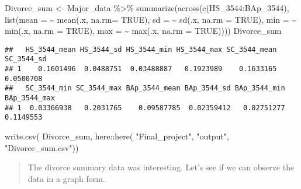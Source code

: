 \documentclass[
]{article}
\newenvironment{Shaded}{\begin{snugshade}}{\end{snugshade}}
\newcommand{\AttributeTok}[1]{\textcolor[rgb]{0.77,0.63,0.00}{#1}}
\newcommand{\ConstantTok}[1]{\textcolor[rgb]{0.00,0.00,0.00}{#1}}
\newcommand{\FunctionTok}[1]{\textcolor[rgb]{0.00,0.00,0.00}{#1}}
\newcommand{\NormalTok}[1]{#1}
\newcommand{\OtherTok}[1]{\textcolor[rgb]{0.56,0.35,0.01}{#1}}
\newcommand{\SpecialCharTok}[1]{\textcolor[rgb]{0.00,0.00,0.00}{#1}}
\newcommand{\StringTok}[1]{\textcolor[rgb]{0.31,0.60,0.02}{#1}}
\begin{document}
\begin{Shaded}
\begin{Highlighting}[]
\NormalTok{Divorce\_sum }\OtherTok{\textless{}{-}}\NormalTok{ Major\_data }\SpecialCharTok{\%\textgreater{}\%} 
  \FunctionTok{summarize}\NormalTok{(}\FunctionTok{across}\NormalTok{(}\FunctionTok{c}\NormalTok{(HS\_3544}\SpecialCharTok{:}\NormalTok{BAp\_3544),}
                      \FunctionTok{list}\NormalTok{(}\AttributeTok{mean =} \SpecialCharTok{\textasciitilde{}} \FunctionTok{mean}\NormalTok{(.x, }\AttributeTok{na.rm=} \ConstantTok{TRUE}\NormalTok{),}
                \AttributeTok{sd =} \SpecialCharTok{\textasciitilde{}} \FunctionTok{sd}\NormalTok{(.x, }\AttributeTok{na.rm =} \ConstantTok{TRUE}\NormalTok{),}
                \AttributeTok{min =} \SpecialCharTok{\textasciitilde{}} \FunctionTok{min}\NormalTok{(.x, }\AttributeTok{na.rm =} \ConstantTok{TRUE}\NormalTok{),}
                \AttributeTok{max =} \SpecialCharTok{\textasciitilde{}} \FunctionTok{max}\NormalTok{(.x, }\AttributeTok{na.rm =} \ConstantTok{TRUE}\NormalTok{))))}
\NormalTok{Divorce\_sum}
\end{Highlighting}
\end{Shaded}

\begin{verbatim}
##   HS_3544_mean HS_3544_sd HS_3544_min HS_3544_max SC_3544_mean SC_3544_sd
## 1    0.1601496  0.0488751  0.03488887   0.1923989    0.1633165  0.0500708
##   SC_3544_min SC_3544_max BAp_3544_mean BAp_3544_sd BAp_3544_min BAp_3544_max
## 1  0.03366938   0.2031765    0.09587785  0.02359412   0.02751277    0.1149553
\end{verbatim}

\begin{Shaded}
\begin{Highlighting}[]
\FunctionTok{write.csv}\NormalTok{(}
\NormalTok{  Divorce\_sum,}
\NormalTok{          here}\SpecialCharTok{::}\FunctionTok{here}\NormalTok{(}
            \StringTok{"Final\_project"}\NormalTok{,}
            \StringTok{"output"}\NormalTok{,}
            \StringTok{"Divorce\_sum.csv"}\NormalTok{))}
\end{Highlighting}
\end{Shaded}

\begin{quote}
The divorce summary data was interesting. Let's see if we can observe
the data in a graph form.
\end{quote}
\end{document}
